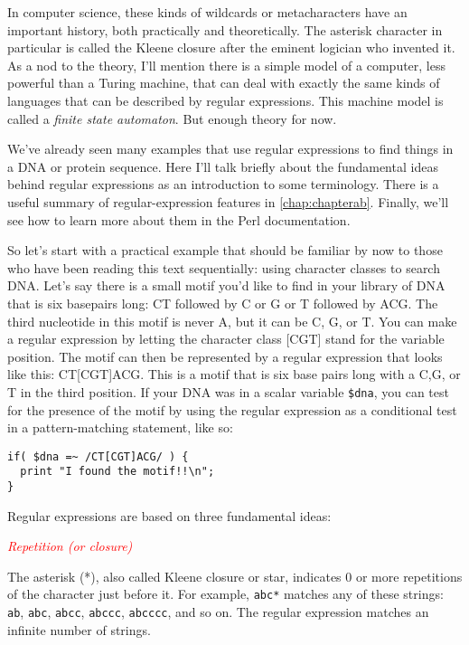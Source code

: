 In computer science, these kinds of wildcards or metacharacters have an important history, both practically and theoretically. The asterisk character in particular is called the Kleene closure after the eminent logician who invented it. As a nod to the theory, I'll mention there is a simple model of a computer, less powerful than a Turing machine, that can deal with exactly the same kinds of languages that can be described by regular expressions. This machine model is called a \textit{finite state automaton}. But enough theory for now. 

We've already seen many examples that use regular expressions to find things in a DNA or protein sequence. Here I'll talk briefly about the fundamental ideas behind regular expressions as an introduction to some terminology. There is a useful summary of regular-expression features in \autoref{chap:chapterab}. Finally, we'll see how to learn more about them in the Perl documentation.

So let's start with a practical example that should be familiar by now to those who have been reading this text sequentially: using character classes to search DNA. Let's say there is a small motif you'd like to find in your library of DNA that is six basepairs long: CT followed by C or G or T followed by ACG. The third nucleotide in this motif is never A, but it can be C, G, or T. You can make a regular expression by letting the character class [CGT] stand for the variable position. The motif can then be represented by a regular expression that looks like this: CT[CGT]ACG. This is a motif that is six base pairs long with a C,G, or T in the third position. If your DNA was in a scalar variable \verb|$dna|, you can test for the presence of the motif by using the regular expression as a conditional test in a pattern-matching statement, like so:

\begin{lstlisting}
if( $dna =~ /CT[CGT]ACG/ ) {
  print "I found the motif!!\n";
}
\end{lstlisting}

Regular expressions are based on three fundamental ideas:

\textcolor{red}{\textit{Repetition (or closure)}}
\begin{adjustwidth}{1cm}{}
The asterisk (*), also called Kleene closure or star, indicates 0 or more repetitions of the character just before it. For example, \verb|abc*| matches any of these strings: \verb|ab|, \verb|abc|, \verb|abcc|, \verb|abccc|, \verb|abcccc|, and so on. The regular expression matches an infinite number of strings. 
\end{adjustwidth}

